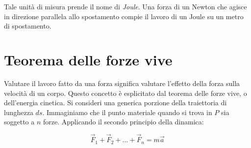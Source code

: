 Tale unità di misura prende il nome di \emph{Joule}. Una forza di un Newton che agisce in direzione parallela allo spostamento compie il lavoro di un Joule su un metro di spostamento.

\section{Teorema delle forze vive}

Valutare il lavoro fatto da una forza significa valutare l'effetto della forza sulla velocità di un corpo. Questo concetto è esplicitato dal teorema delle forze vive, o dell'energia cinetica. Si consideri una generica porzione della traiettoria di lunghezza $ds$. Immaginiamo che il punto materiale quando si trova in $P$ sia soggetto a $n$ forze.  Applicando il secondo principio della dinamica:

\[
	\vec{F}_1+\vec{F}_2+\dots +\vec{F}_n=m\vec{a}
\]

